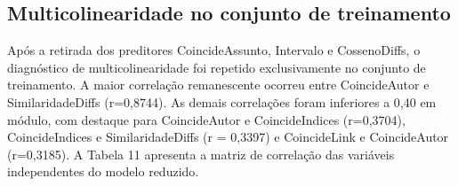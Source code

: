 \subsection{\texorpdfstring{Multicolinearidade no conjunto de
			treinamento}{Multicolinearidade no conjunto de treinamento}}\label{multicolinearidade-no-conjunto-de-treinamento}

Após a retirada dos preditores CoincideAssunto, Intervalo e CossenoDiffs, o diagnóstico de multicolinearidade foi repetido exclusivamente no conjunto de treinamento. A maior correlação remanescente ocorreu entre CoincideAutor e SimilaridadeDiffs (r=0,8744). As demais correlações foram inferiores a 0,40 em módulo, com destaque para CoincideAutor e CoincideIndices (r=0,3704), CoincideIndices e SimilaridadeDiffs (r = 0,3397) e CoincideLink e CoincideAutor (r=0,3185). A Tabela 11 apresenta a matriz de correlação das variáveis independentes do modelo reduzido.

